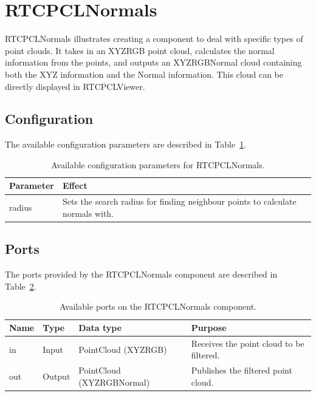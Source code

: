 \documentclass[a4paper,10pt]{article}
\begin{document}
\section{RTCPCLNormals}
\label{sec:rtcpclnormals}

RTCPCLNormals illustrates creating a component to deal with specific types of
point clouds. It takes in an XYZRGB point cloud, calculates the normal
information from the points, and outputs an XYZRGBNormal cloud containing both
the XYZ information and the Normal information. This cloud can be directly
displayed in RTCPCLViewer.

\subsection{Configuration}
\label{sec1:normals_configuration}

The available configuration parameters are described in
Table~\ref{tab:normals_config_params}.

\begin{table}[t]
  \centering
  \begin{tabularx}{\columnwidth}{lX}
    \toprule
    Parameter & Effect \\
    \midrule
    radius & Sets the search radius for finding neighbour points to calculate normals with. \\
    \bottomrule
  \end{tabularx}
  \caption{Available configuration parameters for RTCPCLNormals.}
  \label{tab:normals_config_params}
\end{table}

\subsection{Ports}
\label{sec1:normals_port}

The ports provided by the RTCPCLNormals component are described in Table~\ref{tab:normals_ports}.

\begin{table}[t]
  \centering
  \begin{tabularx}{\columnwidth}{lllX}
    \toprule
    Name & Type & Data type & Purpose \\
    \midrule
    in & Input & PointCloud (XYZRGB) & Receives the point cloud to be filtered. \\
    out & Output & PointCloud (XYZRGBNormal) & Publishes the filtered point cloud. \\
    \bottomrule
  \end{tabularx}
  \caption{Available ports on the RTCPCLNormals component.}
  \label{tab:normals_ports}
\end{table}
\end{document}
